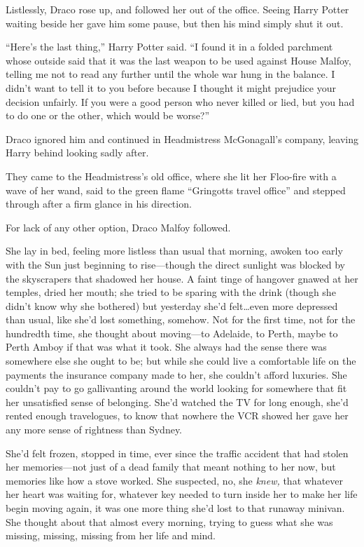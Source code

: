 Listlessly, Draco rose up, and followed her out of the office. Seeing Harry Potter waiting beside her gave him some pause, but then his mind simply shut it out.

“Here’s the last thing,” Harry Potter said. “I found it in a folded parchment whose outside said that it was the last weapon to be used against House Malfoy, telling me not to read any further until the whole war hung in the balance. I didn’t want to tell it to you before because I thought it might prejudice your decision unfairly. If you were a good person who never killed or lied, but you had to do one or the other, which would be worse?”

Draco ignored him and continued in Headmistress McGonagall’s company, leaving Harry behind looking sadly after.

They came to the Headmistress’s old office, where she lit her Floo-fire with a wave of her wand, said to the green flame “Gringotts travel office” and stepped through after a firm glance in his direction.

For lack of any other option, Draco Malfoy followed.

\later

She lay in bed, feeling more listless than usual that morning, awoken too early with the Sun just beginning to rise—though the direct sunlight was blocked by the skyscrapers that shadowed her house. A faint tinge of hangover gnawed at her temples, dried her mouth; she tried to be sparing with the drink (though she didn’t know why she bothered) but yesterday she’d felt…even more depressed than usual, like she’d lost something, somehow. Not for the first time, not for the hundredth time, she thought about moving—to Adelaide, to Perth, maybe to Perth Amboy if that was what it took. She always had the sense there was somewhere else she ought to be; but while she could live a comfortable life on the payments the insurance company made to her, she couldn’t afford luxuries. She couldn’t pay to go gallivanting around the world looking for somewhere that fit her unsatisfied sense of belonging. She’d watched the TV for long enough, she’d rented enough travelogues, to know that nowhere the VCR showed her gave her any more sense of rightness than Sydney.

She’d felt frozen, stopped in time, ever since the traffic accident that had stolen her memories—not just of a dead family that meant nothing to her now, but memories like how a stove worked. She suspected, no, she \emph{knew,} that whatever her heart was waiting for, whatever key needed to turn inside her to make her life begin moving again, it was one more thing she’d lost to that runaway minivan. She thought about that almost every morning, trying to guess what she was missing, missing, missing from her life and mind.

